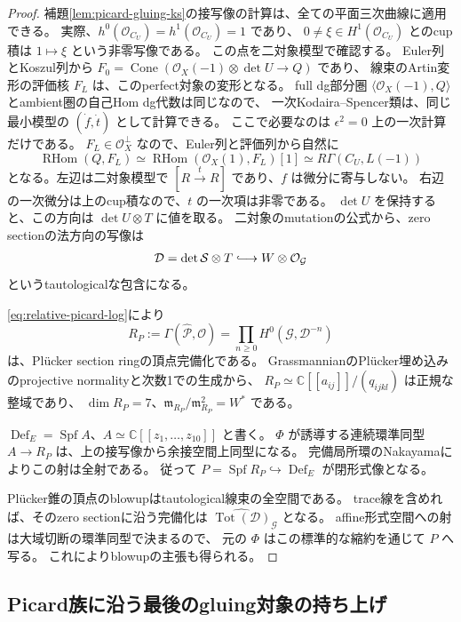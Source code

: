 \documentclass[a4paper,11pt]{ltjsarticle}
\theoremstyle{definition}
\newcommand{\CC}{\mathbb C}
\newcommand{\OO}{\mathcal O}
\newcommand{\Spf}{\operatorname{Spf}}
\newcommand{\Def}{\operatorname{Def}}
\newcommand{\RHom}{\operatorname{RHom}}
\begin{document}
\begin{proof}
補題\ref{lem:picard-gluing-ks}の接写像の計算は、全ての平面三次曲線に適用できる。
実際、$h^0(\OO_{C_U})=h^1(\OO_{C_U})=1$ であり、
$0\ne\xi\in H^1(\OO_{C_U})$ とのcup積は $1\mapsto\xi$ という非零写像である。
この点を二対象模型で確認する。
Euler列とKoszul列から
$F_0=\operatorname{Cone}(\OO_X(-1)\otimes\det U\to Q)$ であり、
線束のArtin変形の評価核 $F_L$ は、このperfect対象の変形となる。
full dg部分圏 $\langle\OO_X(-1),Q\rangle$ とambient圏の自己Hom dg代数は同じなので、
一次Kodaira--Spencer類は、同じ最小模型の $(\dot f,\dot t)$ として計算できる。
ここで必要なのは $\epsilon^2=0$ 上の一次計算だけである。
$F_L\in\OO_X^\perp$ なので、Euler列と評価列から自然に
\[
 \RHom(Q,F_L)
  \simeq\RHom(\OO_X(1),F_L)[1]
  \simeq R\Gamma(C_U,L(-1))
\]
となる。左辺は二対象模型で $[R\xrightarrow{t}R]$ であり、$f$ は微分に寄与しない。
右辺の一次微分は上のcup積なので、$t$ の一次項は非零である。
$\det U$ を保持すると、この方向は $\det U\otimes T$ に値を取る。
二対象のmutationの公式から、zero sectionの法方向の写像は
\[
 \mathcal D=\det\mathcal S\otimes T
    \lhook\joinrel\longrightarrow W\otimes\OO_{\mathcal G}
\]
というtautologicalな包含になる。

\eqref{eq:relative-picard-log}により
\[
 R_P:=\Gamma(\widehat{\mathcal P},\OO)
   =\prod_{n\ge0}H^0(\mathcal G,\mathcal D^{-n})
\]
は、Pl\"ucker section ringの頂点完備化である。
GrassmannianのPl\"ucker埋め込みのprojective normalityと次数1での生成から、
$R_P\simeq\CC[[a_{ij}]]/(q_{ijkl})$ は正規な整域であり、
$\dim R_P=7$、$\mathfrak m_{R_P}/\mathfrak m_{R_P}^2=W^*$ である。

$\Def_E=\Spf A$、$A\simeq\CC[[z_1,\ldots,z_{10}]]$ と書く。
$\Phi$ が誘導する連続環準同型 $A\to R_P$ は、上の接写像から余接空間上同型になる。
完備局所環のNakayamaによりこの射は全射である。
従って $P=\Spf R_P\hookrightarrow\Def_E$ が閉形式像となる。

Pl\"ucker錐の頂点のblowupはtautological線束の全空間である。
trace線を含めれば、そのzero sectionに沿う完備化は
$\widehat{\operatorname{Tot}(\mathcal D)}_{\mathcal G}$ となる。
affine形式空間への射は大域切断の環準同型で決まるので、
元の $\Phi$ はこの標準的な縮約を通じて $P$ へ写る。
これによりblowupの主張も得られる。
\end{proof}

\subsection{Picard族に沿う最後のgluing対象の持ち上げ}
\end{document}
